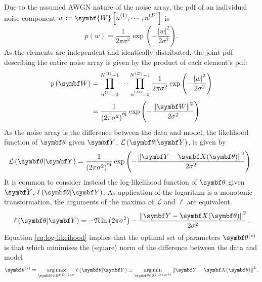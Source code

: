 Due to the assumed \ac{AWGN} nature of the noise array, the \ac{pdf} of an individual noise component
$w \coloneq \symbf{W}\left[\none, \cdots, \nD\right]$ is
\begin{equation}
    p(w) =
        \frac{1}{2\pi \sigma^2}
        \exp\left( -\frac{\left\lvert w \right\rvert^2}{2\sigma^2}\right).
\end{equation}
As the elements are independent and identically distributed, the joint \ac{pdf}
describing the entire noise array is given by the product of each element's
\ac{pdf}:
\begin{equation}
    \begin{split}
        p\left(\bW\right) &=
            \prod_{\none=0}^{\None - 1}
            \cdots
            \prod_{\nD=0}^{\ND - 1}
            \frac{1}{2\pi \sigma^2}
            \exp\left(
                -\frac
                {\left\lvert w \right\rvert^2}
                {2\sigma^2}\right) \\
            &= \frac{1}{\left(2\pi \sigma^2\right)^{\mathfrak{N}}}
            \exp\left( -\frac{\left\lVert \bW \right\rVert^2}{2\sigma^2}\right)
    \end{split}
\end{equation}
As the noise array is the difference between the data and model, the
likelihood function of $\bth$ given $\bY$, $\mathcal{L}\left(\bth \vert
\bY\right)$, is given by
\begin{equation}
    \mathcal{L}\left(\bth \vert \bY\right) =
    \frac{1}{\left(2\pi \sigma^2\right)^{\mathfrak{N}}}
        \exp\left( -\frac{\left\lVert \bY - \bX(\bth) \right\rVert^2}{2\sigma^2}\right).
\end{equation}
It is common to consider instead the log-likelihood function of $\bth$ given
$\bY$, $\ell\left(\bth \vert \bY\right)$. As application of the logarithm is a
monotonic transformation, the arguments of the maxima of $\mathcal{L}$ and
$\ell$ are equivalent.
\begin{equation}
    \ell\left(\bth \vert \bY\right) =
        -\mathfrak{N} \ln\left(2 \pi \sigma^2\right)
        -\frac{\left\lVert \bY - \bX(\bth) \right\rVert^2}{2\sigma^2}.
    \label{eq:log-likeihood}
\end{equation}
Equation \ref{eq:log-likeihood} implies that the optimal set of parameters
$\bth^{(*)}$
is that which minimises the
(square) norm of the difference between the data and model
\begin{equation}
    \bthstar = \argmax_{\bth \in \mathbb{R}^{2(D+2)M}}
        \ell\left(\bth \vert \bY\right) \equiv
        \argmin_{\bth \in \mathbb{R}^{2(D+2)M}} \left\lVert \bY - \bX(\bth) \right\rVert^2.
    \label{eq:argmin_y-x}
\end{equation}
